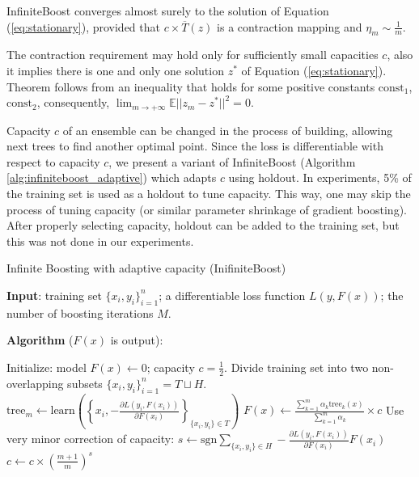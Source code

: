 
\begin{theorem}
InfiniteBoost converges almost surely to the solution of Equation (\ref{eq:stationary}),
provided that $c \times \overline{T}(z)$ is a contraction mapping and
$\eta_m \sim \frac{1}{m}$.
\end{theorem}

The contraction requirement may hold only for sufficiently small capacities $c$,
also it implies there is one and only one solution $z^{*}$ of Equation (\ref{eq:stationary}).
Theorem follows from an inequality
that holds for some positive constants $\text{const}_1$, $\text{const}_2$,
consequently, $\lim_{m \to +\infty} \mathbb{E} || z_{m} - z^{*} ||^2 = 0$.

Capacity $c$ of an ensemble can be changed in the process of building,
allowing next trees to find another optimal point.
Since the loss is differentiable with respect to capacity $c$,
we present a variant of InfiniteBoost (Algorithm \ref{alg:infiniteboost_adaptive}) which adapts $c$ using holdout.
In experiments, 5\% of the training set is used as a holdout to tune capacity.
This way, one may skip the process of tuning capacity (or similar parameter shrinkage of gradient boosting).
After properly selecting capacity, holdout can be added to the training set, but this was not done in our experiments.

\begin{algorithm}[!h]
  \caption{Infinite Boosting with adaptive capacity (InifiniteBoost)}\label{alg:infiniteboost_adaptive}
  {\bf Input}: training set $\{x_i, y_i\}_{i=1}^n$; a differentiable loss function $L(y, F(x))$; the number of boosting iterations $M$.

  {\bf Algorithm} ($F(x)$ is output):
  \begin{algorithmic}
    \State Initialize: model $F(x) \gets 0$; capacity $c=\frac{1}{2}$.
    \State Divide training set into two non-overlapping subsets $\{x_i, y_i\}_{i=1}^n=T\sqcup H$.
      \State $\text{tree}_m \gets \text{learn}\left(\left\{x_i, -\frac{\partial L(y_i, F(x_i))}{\partial F(x_i)}\right\}_{\{x_i, y_i\}\in T}\right)$
      \State $F(x) \gets \frac{\sum_{k=1}^m \alpha_k \text{tree}_k(x)}{\sum_{k=1}^m \alpha_k} \times c$
      \State Use very minor correction of capacity:
      \State $s \gets \text{sgn} \sum_{\{x_i, y_i\}\in H} -\frac{\partial L(y_i, F(x_i))}{\partial F(x_i)} F(x_i)$
      \State $c \gets c\times \left(\frac{m+1}{m}\right)^s$
    \EndFor
  \end{algorithmic}
\end{algorithm}

